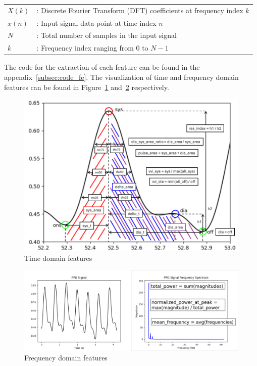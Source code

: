 \begin{flushleft}
    \small
    \begin{tabular}{ll}
        $X(k)$ & : Discrete Fourier Transform (DFT) coefficients at frequency index $k$ \\
        $x(n)$ & : Input signal data point at time index $n$                            \\
        $N$    & : Total number of samples in the input signal                          \\
        $k$    & : Frequency index ranging from $0$ to $N-1$                            \\
    \end{tabular}
\end{flushleft}

The code for the extraction of each feature can be found in the appendix~\ref{subsec:code_fe}.
The visualization of time and frequency domain features can be found in Figure~\ref{fig:td_feats} and~\ref{fig:fd_feats} respectively.

\begin{figure}[h]
    \vspace{-0.3cm}
    \includegraphics[width=1\textwidth]{images/methods/feats}
    \vspace{-0.75cm}
    \caption{Time domain features}
    \label{fig:td_feats}
\end{figure}

\begin{figure}[h]
    \hspace{-1cm}
    \includegraphics[width=1.1\textwidth]{images/methods/median_fft}
    \caption{Frequency domain features}
    \label{fig:fd_feats}
\end{figure}

